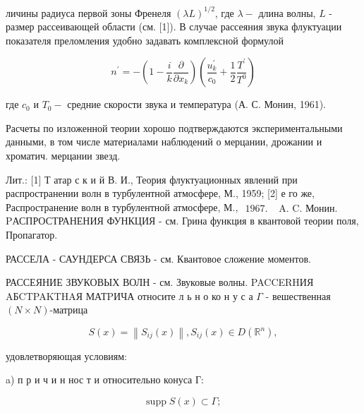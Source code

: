 \documentclass[10pt]{article}
\begin{document}
личины радиуса первой зоны Френеля $(\lambda L)^{1 / 2}$, где $\lambda-$ длина волны, $L$ - размер рассеивающей области (см. [1]). В случае рассеяния звука флуктуации показателя преломления удобно задавать комплексной формулой



\[

n^{\prime}=-\left(1-\frac{i}{k} \frac{\partial}{\partial x_{k}}\right)\left(\frac{u_{k}^{\prime}}{c_{0}}+\frac{1}{2} \frac{T^{\prime}}{T^{0}}\right)

\]



где $c_{0}$ и $T_{0}-$ средние скорости звука и температура (А. С. Монин, 1961).



Расчеты по изложенной теории хорошо подтверждаются экспериментальными данными, в том числе материалами наблюдений о мерцании, дрожании и хроматич. мерцании звезд.



Лит.: [1] Т атар с к и й В. И., Теория флуктуационных явлений при распространении волн в турбулентной атмосфере, М., 1959; [2] е го же, Распространение волн в турбулентной атмосфере, М., $\begin{array}{ll}1967 . & \text { A. C. Монин. }\end{array}$ PАСПРОСТРАНЕНИЯ ФУНКЦИЯ - см. Грина функция в квантовой теории поля, Пропагатор.



РАССЕЛА - САУНДЕРСА СВЯЗЬ - см. Квантовое сложение моментов.



РАССЕЯНИЕ ЗВУКОВЫХ ВОЛН - см. Звуковые волны. PACCERHИЯ AБCTPAKTHAЯ МАТPИЧА относите л ь н о ко н у с а $\Gamma$ - вешественная $(N \times N)$-матрица



\[

S(x)=\left\|S_{i j}(x)\right\|, S_{i j}(x) \in D\left(\mathbb{R}^{n}\right),

\]



удовлетворяющая условиям:



a) п р и ч и н нос т и относительно конуса Г:



\[

\operatorname{supp} S(x) \subset \Gamma \text {; }

\]
\end{document}
